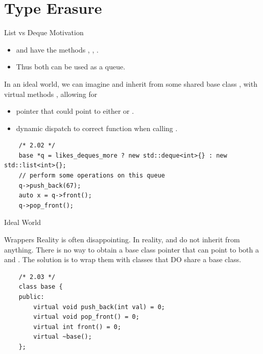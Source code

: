 \section{Type Erasure}


\begin{frame}[fragile]{List vs Deque Motivation}
  \begin{itemize}
    \item {} and  have the methods , , .
    \item Thus both can be used as a queue.
  \end{itemize}

  In an ideal world, we can imagine  and 
  inherit from some shared base class , with virtual methods , allowing for
  \begin{itemize}
    \item {} pointer that could point to either  or .
    \item dynamic dispatch to correct function when calling .
  \end{itemize}

  \begin{verbatim}
    /* 2.02 */
    base *q = likes_deques_more ? new std::deque<int>{} : new std::list<int>{};
    // perform some operations on this queue
    q->push_back(67);
    auto x = q->front();
    q->pop_front();
  \end{verbatim}
\end{frame}

\begin{frame}{Ideal World}
  
\end{frame}

\begin{frame}[fragile]{Wrappers}
  Reality is often disappointing. In reality,  and  
  do not inherit from anything.
  There is no way to obtain a base class pointer that can point to both a  and .
  The solution is to wrap them with classes that DO share a base class.

  \begin{verbatim}
    /* 2.03 */
    class base {
    public:
        virtual void push_back(int val) = 0;
        virtual void pop_front() = 0;
        virtual int front() = 0;
        virtual ~base();
    };
  \end{verbatim}
\end{frame}

